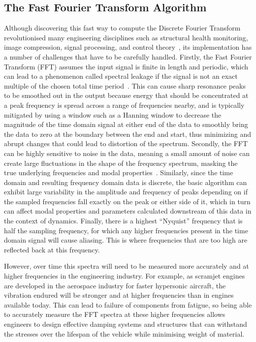 \documentclass[12pt]{article}
\begin{document}
    \subsection{The Fast Fourier Transform Algorithm}
    Although discovering this fast way to compute the Discrete Fourier Transform revolutionised many engineering disciplines such as structural health monitoring, image compression, signal processing, and control theory~\cite{Byjus2023}, its implementation has a number of challenges that have to be carefully handled.
    Firstly, the Fast Fourier Transform (FFT) assumes the input signal is finite in length and periodic, which can lead to a phenomenon called spectral leakage if the signal is not an exact multiple of the chosen total time period~\cite{MathStackExchange2023}.
    This can cause sharp resonance peaks to be smoothed out in the output because energy that should be concentrated at a peak frequency is spread across a range of frequencies nearby, and is typically mitigated by using a window such as a Hanning window to decrease the magnitude of the time domain signal at either end of the data to smoothly bring the data to zero at the boundary between the end and start, thus minimizing and abrupt changes that could lead to distortion of the spectrum.
    Secondly, the FFT can be highly sensitive to noise in the data, meaning a small amount of noise can create large fluctuations in the shape of the frequency spectrum, masking the true underlying frequencies and modal properties~\cite{MathStackExchange2023}.
    Similarly, since the time domain and resulting frequency domain data is discrete, the basic algorithm can exhibit large variability in the amplitude and frequency of peaks depending on if the sampled frequencies fall exactly on the peak or either side of it, which in turn can affect modal properties and parameters calculated downstream of this data in the context of dynamics.
    Finally, there is a highest ``Nyquist'' frequency that is half the sampling frequency, for which any higher frequencies present in the time domain signal will cause aliasing.
    This is where frequencies that are too high are reflected back at this frequency.

    However, over time this spectra will need to be measured more accurately and at higher frequencies in the engineering industry.
    For example, as scramjet engines are developed in the aerospace industry for faster hypersonic aircraft, the vibration endured will be stronger and at higher frequencies than in engines available today.
    This can lead to failure of components from fatigue, so being able to accurately measure the FFT spectra at these higher frequencies allows engineers to design effective damping systems and structures that can withstand the stresses over the lifespan of the vehicle while minimising weight of material.
\end{document}
